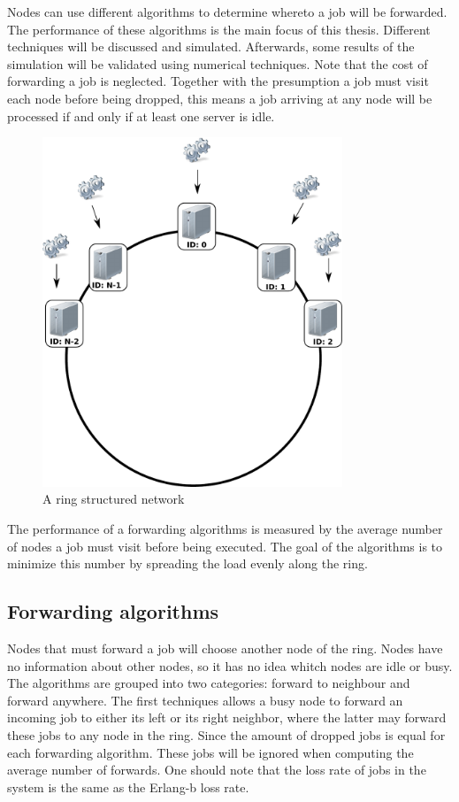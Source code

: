 \documentclass[10pt,a4paper]{article}
\begin{document}
Nodes can use different algorithms to determine whereto a job will be forwarded. The performance of these algorithms is the main focus of this thesis. Different techniques will be discussed and simulated. Afterwards, some results of the simulation will be validated using numerical techniques.
Note that the cost of forwarding a job is neglected. Together with the presumption a job must visit each node before being dropped, this means a job arriving at any node will be processed if and only if at least one server is idle.

\begin{figure}[h!tb]
\centering
\includegraphics[width=0.8\textwidth,clip=true,trim=0px 225px 0px 0px]{resources/drawing.pdf}
\caption{A ring structured network}
\label{figring}
\end{figure}

The performance of a forwarding algorithms is measured by the average number of nodes a job must visit before being executed. The goal of the algorithms is to minimize this number by spreading the load evenly along the ring. 

\subsection{Forwarding algorithms}
Nodes that must forward a job will choose another node of the ring. Nodes have no information about other nodes, so it has no idea whitch nodes are idle or busy. The algorithms are grouped into two categories: forward to neighbour and forward anywhere.
The first techniques allows a busy node to forward an incoming job to either its left or its right neighbor, where the latter may forward these jobs to any node in the ring. 
Since the amount of dropped jobs is equal for each forwarding algorithm. These jobs will be ignored when computing the average number of forwards. One should note that the loss rate of jobs in the system is the same as the Erlang-b loss rate.
\end{document}
